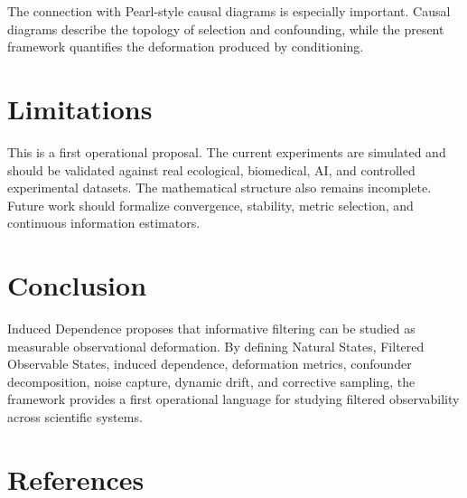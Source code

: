 \documentclass[11pt]{article}
\begin{document}
The connection with Pearl-style causal diagrams is especially important. Causal diagrams describe the topology of selection and confounding, while the present framework quantifies the deformation produced by conditioning.

\section{Limitations}

This is a first operational proposal. The current experiments are simulated and should be validated against real ecological, biomedical, AI, and controlled experimental datasets. The mathematical structure also remains incomplete. Future work should formalize convergence, stability, metric selection, and continuous information estimators.

\section{Conclusion}

Induced Dependence proposes that informative filtering can be studied as measurable observational deformation. By defining Natural States, Filtered Observable States, induced dependence, deformation metrics, confounder decomposition, noise capture, dynamic drift, and corrective sampling, the framework provides a first operational language for studying filtered observability across scientific systems.


\section*{References}
\end{document}
